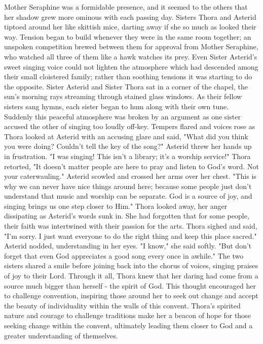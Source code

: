 \documentclass[11pt]{article}
\begin{document}
Mother Seraphine was a formidable presence, and it seemed to the others that her shadow grew more ominous with each passing day. Sisters Thora and Asterid tiptoed around her like skittish mice, darting away if she so much as looked their way. Tension began to build whenever they were in the same room together; an unspoken competition brewed between them for approval from Mother Seraphine, who watched all three of them like a hawk watches its prey. Even Sister Asterid's sweet singing voice could not lighten the atmosphere which had descended among their small cloistered family; rather than soothing tensions it was starting to do the opposite.
Sister Asterid and Sister Thora sat in a corner of the chapel, the sun's morning rays streaming through stained glass windows. As their fellow sisters sang hymns, each sister began to hum along with their own tune. Suddenly this peaceful atmosphere was broken by an argument as one sister accused the other of singing too loudly off-key. Tempers flared and voices rose as Thora looked at Asterid with an accusing glare and said, "What did you think you were doing? Couldn't tell the key of the song?"
Asterid threw her hands up in frustration. "I was singing! This isn't a library; it's a worship service!"
Thora retorted, "It doesn't matter people are here to pray and listen to God's word. Not your caterwauling."
Asterid scowled and crossed her arms over her chest. "This is why we can never have nice things around here; because some people just don't understand that music and worship can be separate. God is a source of joy, and singing brings us one step closer to Him."
Thora looked away, her anger dissipating as Asterid's words sunk in. She had forgotten that for some people, their faith was intertwined with their passion for the arts. Thora sighed and said, "I'm sorry. I just want everyone to do the right thing and keep this place sacred."
Asterid nodded, understanding in her eyes. "I know," she said softly. "But don't forget that even God appreciates a good song every once in awhile."
The two sisters shared a smile before joining back into the chorus of voices, singing praises of joy to their Lord.
Through it all, Thora knew that her daring had come from a source much bigger than herself - the spirit of God. This thought encouraged her to challenge convention, inspiring those around her to seek out change and accept the beauty of individuality within the walls of this convent. Thora's spirited nature and courage to challenge traditions make her a beacon of hope for those seeking change within the convent, ultimately leading them closer to God and a greater understanding of themselves.
\end{document}
